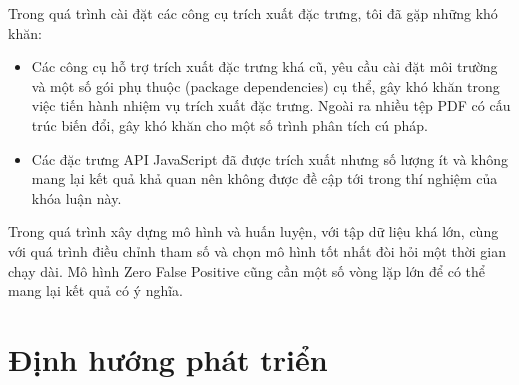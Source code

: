 \documentclass[./../main.tex]{subfiles}
\begin{document}
Trong quá trình cài đặt các công cụ trích xuất đặc trưng, tôi đã gặp những khó khăn:
\begin{itemize}
	\item
	      Các công cụ hỗ trợ trích xuất đặc trưng khá cũ, yêu cầu cài đặt môi trường và một số gói phụ thuộc (package dependencies) cụ thể, gây khó khăn trong việc tiến hành nhiệm vụ trích xuất đặc trưng. Ngoài ra nhiều tệp PDF có cấu trúc biến đổi, gây khó khăn cho một số trình phân tích cú pháp.
	\item
	      Các đặc trưng API JavaScript đã được trích xuất nhưng số lượng ít và không mang lại kết quả khả quan nên không được đề cập tới trong thí nghiệm của khóa luận này.

\end{itemize}
Trong quá trình xây dựng mô hình và huấn luyện, với tập dữ liệu khá lớn, cùng với quá trình điều chỉnh tham số và chọn mô hình tốt nhất đòi hỏi một thời gian chạy dài. Mô hình Zero False Positive cũng cần một số vòng lặp lớn để có thể mang lại kết quả có ý nghĩa.

\section{Định hướng phát triển}
\end{document}
